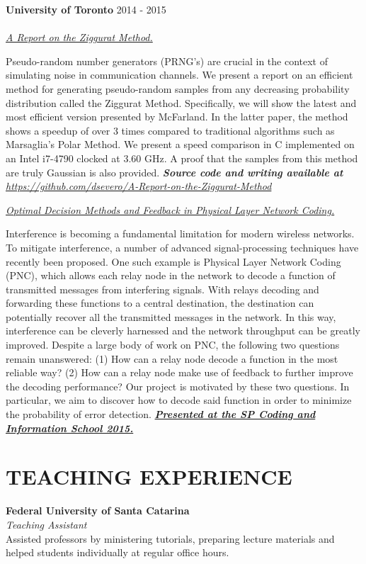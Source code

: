 \documentclass[margin, line]{res}
\begin{document}
\begin{resume}
\textbf{University of Toronto} \hfill 2014 - 2015\\
\\
\underline{\sl A Report on the Ziggurat Method.}\\
\begin{small}
    Pseudo-random number generators (PRNG's) are crucial in the context of simulating noise in communication channels. We present a report on an efficient method for generating pseudo-random samples from any decreasing probability distribution called the Ziggurat Method. Specifically, we will show the latest and most efficient version presented by McFarland. In the latter paper, the method shows a speedup of over 3 times compared to traditional algorithms such as Marsaglia's Polar Method. We present a speed comparison in C implemented on an Intel i7-4790 clocked at 3.60 GHz. A proof that the samples from this method are truly Gaussian is also provided. {\sl \textbf{Source code and writing available at} \url{https://github.com/dsevero/A-Report-on-the-Ziggurat-Method}}
\end{small}
\newpage
\underline{\sl Optimal Decision Methods and Feedback in Physical Layer Network Coding.}\\
\begin{small}
    Interference is becoming a fundamental limitation for modern wireless networks. To mitigate interference, a number of advanced signal-processing techniques have recently been proposed. One such example is Physical Layer Network Coding (PNC), which allows each relay node in the network to decode a function of transmitted messages from interfering signals. With relays decoding and forwarding these functions to a central destination, the destination can potentially recover all the transmitted messages in the network. In this way, interference can be cleverly harnessed and the network throughput can be greatly improved. Despite a large body of work on PNC, the following two questions remain unanswered: (1) How can a relay node decode a function in the most reliable way? (2) How can a relay node make use of feedback to further improve the decoding performance? Our project is motivated by these two questions. In particular, we aim to discover how to decode said function in order to minimize the probability of error detection. \href{https://www.ime.unicamp.br/spcodingschool/}{\sl \textbf{Presented at the SP Coding and Information School 2015.}}
\end{small}

\section{TEACHING EXPERIENCE}
\textbf{Federal University of Santa Catarina}\\
{\sl Teaching Assistant}\\
Assisted professors by ministering tutorials, preparing lecture materials and helped students individually at regular office hours.


\end{resume}
\end{document}
